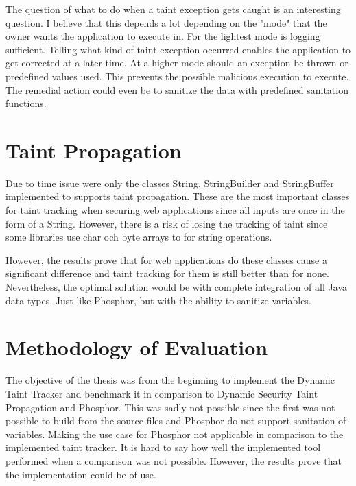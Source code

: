 The question of what to do when a taint exception gets caught is an interesting question. I believe that this depends a lot depending on the "mode" that the owner wants the application to execute in. For the lightest mode is logging sufficient. Telling what kind of taint exception occurred enables the application to get corrected at a later time. At a higher mode should an exception be thrown or predefined values used. This prevents the possible malicious execution to execute. The remedial action could even be to sanitize the data with predefined sanitation functions. 



\section{Taint Propagation}
\label{propagation}
Due to time issue were only the classes String, StringBuilder and StringBuffer implemented to supports taint propagation. These are the most important classes for taint tracking when securing web applications since all inputs are once in the form of a String. However, there is a risk of losing the tracking of taint since some libraries use char och byte arrays to for string operations.

However, the results prove that for web applications do these classes cause a significant difference and taint tracking for them is still better than for none. Nevertheless, the optimal solution would be with complete integration of all Java data types. Just like Phosphor, but with the ability to sanitize variables.



\section{Methodology of Evaluation}
\label{methev}
The objective of the thesis was from the beginning to implement the Dynamic Taint Tracker and benchmark it in comparison to Dynamic Security Taint Propagation and Phosphor. This was sadly not possible since the first was not possible to build from the source files and Phosphor do not support sanitation of variables. Making the use case for Phosphor not applicable in comparison to the implemented taint tracker. It is hard to say how well the implemented tool performed when a comparison was not possible. However, the results prove that the implementation could be of use.